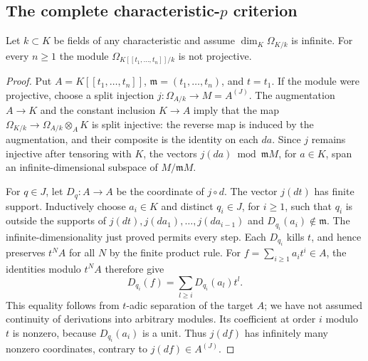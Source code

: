 \subsection{The complete characteristic-\texorpdfstring{$p$}{p} criterion}\label{subsec:A2}

\begin{lemma}\label{SA23-A-06}
Let $k\subset K$ be fields of any characteristic and assume
$\dim_K\Omega_{K/k}$ is infinite.  For every $n\geq1$ the module
$\Omega_{K[[t_1,\ldots,t_n]]/k}$ is not projective.
\end{lemma}
\begin{proof}
Put $A=K[[t_1,\ldots,t_n]]$, $\mathfrak m=(t_1,\ldots,t_n)$, and
$t=t_1$.  If the module were projective, choose a split injection
$j:\Omega_{A/k}\to M=A^{(J)}$.  The augmentation $A\to K$ and the
constant inclusion $K\to A$ imply that the map
$\Omega_{K/k}\to\Omega_{A/k}\otimes_AK$ is split injective: the
reverse map is induced by the augmentation, and their composite
is the identity on each $da$.  Since $j$ remains injective after
tensoring with $K$, the vectors $j(da)\bmod\mathfrak mM$, for
$a\in K$, span an infinite-dimensional subspace of $M/\mathfrak mM$.

For $q\in J$, let $D_q:A\to A$ be the coordinate of $j\circ d$.
The vector $j(dt)$ has finite support.  Inductively choose
$a_i\in K$ and distinct $q_i\in J$, for $i\geq1$, such that $q_i$
is outside the supports of $j(dt),j(da_1),\ldots,j(da_{i-1})$ and
$D_{q_i}(a_i)\notin\mathfrak m$.  The infinite-dimensionality just
proved permits every step.  Each $D_{q_i}$ kills $t$, and hence
preserves $t^NA$ for all $N$ by the finite product rule.
For $f=\sum_{i\geq1}a_it^i\in A$, the identities modulo $t^NA$
therefore give
\[
 D_{q_i}(f)=\sum_{l\geq i} D_{q_i}(a_l)t^l.
\]
This equality follows from $t$-adic separation of the target $A$;
we have not assumed continuity of derivations into arbitrary
modules.  Its coefficient at order $i$ modulo $t$ is nonzero,
because $D_{q_i}(a_i)$ is a unit.  Thus $j(df)$ has infinitely many
nonzero coordinates, contrary to $j(df)\in A^{(J)}$.
\end{proof}

